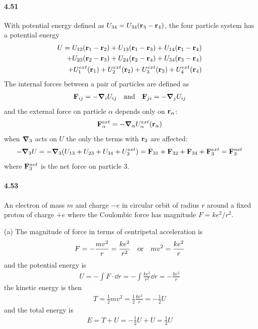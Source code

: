 \documentclass[../problems.tex]{subfiles}
\begin{document}
\paragraph{4.51}
With potential energy defined as $U_{34} = U_{34}(\vb{r}_3 - \vb{r}_4)$, the four particle system
has a potential energy
\begin{align*}
    U = U_{12}(\vb{r}_1 - \vb{r}_2) + U_{13} (\vb{r}_1 - \vb{r}_3) + U_{14} (\vb{r}_1 - \vb{r}_4) \\
    + U_{23} (\vb{r}_2 - \vb{r}_3) + U_{24} (\vb{r}_2 - \vb{r}_4) + U_{34} (\vb{r}_3 - \vb{r}_4) \\
    + U_{1}^{ext} (\vb{r}_1) + U_{2}^{ext} (\vb{r}_2) + U_{3}^{ext} (\vb{r}_3) + U_{4}^{ext}
    (\vb{r}_4)
\end{align*}
The internal forces between a pair of particles are defined as
\begin{align*}
    \vb{F}_{ij} = -\grad_i U_{ij} \qand \vb{F}_{ji} = -\grad_j U_{ij}
\end{align*}
and the external force on particle $\alpha$ depends only on $\vb{r}_\alpha$:
\begin{align*}
    \vb{F}_\alpha^{ext} = -\grad_\alpha U_\alpha^{ext} (\vb{r}_\alpha)
\end{align*} 
when $\grad_3$ acts on $U$ the only the terms with $\vb{r}_3$ are affected:
\begin{align*}
    -\grad_3 U = -\grad_3 (U_{13} + U_{23} + U_{34} + U_3^{ext})
    = \vb{F}_{31} + \vb{F}_{32} + \vb{F}_{34} + \vb{F}_3^{ext}
    = \vb{F}_3^{net}
\end{align*}
where $\vb{F}_3^{net}$ is the net force on particle 3.

\paragraph{4.53} An electron of mass $m$ and charge $-e$ in circular orbit of radius $r$ around a fixed proton of
charge $+e$ where the Coulombic force has magnitude $F = ke^2/r^2$.

(a) The magnitude of force in terms of centripetal acceleration is
\begin{align*}
    F = -\frac{mv^2}{r} = \frac{ke^2}{r^2} \qor mv^2 = \frac{ke^2}{r}
\end{align*}
and the potential energy is
\begin{align*}
    U = -\int F \cdot \dd{r} = -\int \frac{ke^2}{r^2} \dd{r} = -\frac{ke^2}{r}
\end{align*}
the kinetic energy is then
\begin{align*}
    T = \frac{1}{2} mv^2 = \frac{1}{2} \frac{ke^2}{r} = -\frac{1}{2} U
\end{align*}
and the total energy is
\begin{align*}
    E = T + U = -\frac{1}{2} U + U = \frac{1}{2} U
\end{align*}
\end{document}
